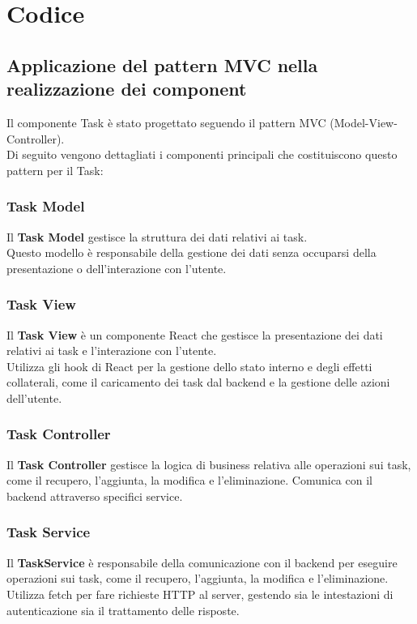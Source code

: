 \section{Codice}
\subsection{Applicazione del pattern MVC nella realizzazione dei component}
Il componente Task è stato progettato seguendo il pattern MVC (Model-View-Controller).
\\Di seguito vengono dettagliati i componenti principali che costituiscono questo pattern per il Task:
\subsubsection{Task Model}
Il \textbf{Task Model} gestisce la struttura dei dati relativi ai task.\\ Questo modello è responsabile della gestione dei dati senza occuparsi della presentazione o dell’interazione con l’utente.

\subsubsection{Task View}
Il \textbf{Task View} è un componente React che gestisce la presentazione dei dati relativi ai task e l'interazione con l'utente.\\
Utilizza gli hook di React per la gestione dello stato interno e degli effetti collaterali, come il caricamento dei task dal backend e la gestione delle azioni dell'utente.
\subsubsection{Task Controller}
Il \textbf{Task Controller} gestisce la logica di business relativa alle operazioni sui task, come il recupero, l'aggiunta,
la modifica e l'eliminazione. Comunica con il backend attraverso specifici service.

\subsubsection{Task Service}
Il \textbf{TaskService} è responsabile della comunicazione con il backend per eseguire operazioni sui task,
come il recupero, l'aggiunta, la modifica e l'eliminazione.\\ Utilizza fetch per fare richieste HTTP al server,
gestendo sia le intestazioni di autenticazione sia il trattamento delle risposte.

